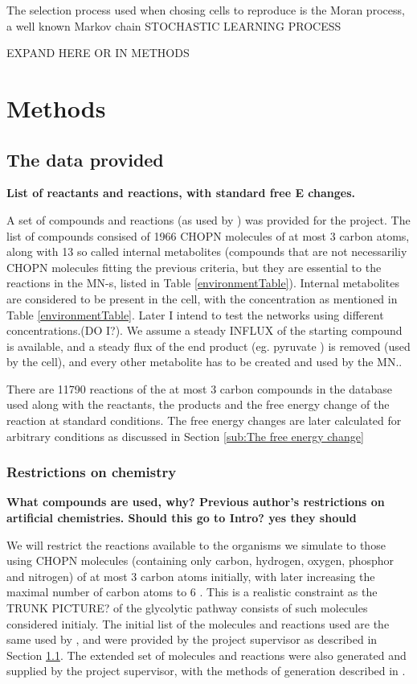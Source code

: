 \documentclass[10pt,a4paper]{article}
\begin{document}
	The selection process used when chosing cells to reproduce is the Moran process, a well known Markov chain \cite[]{absorptionofmoran} STOCHASTIC LEARNING PROCESS
	
	EXPAND HERE OR IN METHODS


	
\section{Methods}
\label{sec:methods}

\subsection{The data provided}
\label{sub:What was I provided with?}
\textbf{List of reactants and reactions, with standard free E changes. }



A set of compounds and reactions (as used by \cite[]{BartekLower}) was provided for the project. The list of compounds consised of 1966 CHOPN molecules of at most 3 carbon atoms, along with 13 so called internal metabolites (compounds that are not necessariliy CHOPN molecules fitting the previous criteria, but they are essential to the reactions in the MN-s, listed in Table \ref{environmentTable}). Internal metabolites are considered to be present in the cell, with the concentration as mentioned in Table \ref{environmentTable}. Later I intend to test the networks using different concentrations.(DO I?). We assume a steady INFLUX of the starting compound is available, and a steady flux of the end product (eg. pyruvate ) is removed (used by the cell), and every other metabolite has to be created and used by the MN.. 
	
	There are 11790 reactions of the at most 3 carbon compounds in the database used along with the reactants, the products and the free energy change of the reaction at standard conditions. The free energy changes are later calculated for arbitrary conditions as discussed in Section \ref{sub:The free energy change}
	
\subsubsection{Restrictions on chemistry}
\label{ssub:Restrictions on chemistry}
\textbf{
What compounds are used, why?
Previous author's restrictions on artificial chemistries. Should this go to Intro? yes they should }

	We will restrict the reactions available to the organisms we simulate to those using CHOPN molecules (containing only carbon, hydrogen, oxygen, phosphor and nitrogen) of at most 3 carbon atoms initially, with later increasing the maximal number of carbon atoms to $6$ . This is a realistic constraint as the TRUNK PICTURE? of the glycolytic pathway consists of such molecules considered initialy. The initial list of the molecules and reactions used are the same used by \cite{BartekLower}, and were provided by the project supervisor as described in Section \ref{sub:What was I provided with?}. The extended set of molecules and reactions were also generated and supplied by the project supervisor, with the methods of generation described in \cite[]{BartekLower}.
\end{document}
